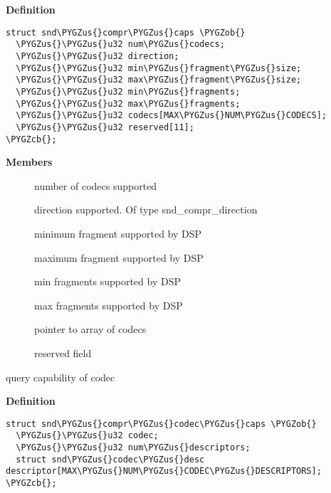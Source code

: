 \documentclass[a4paper,8pt,english]{sphinxmanual}
\def\PYGZus{\char`\_}
\def\PYGZob{\char`\{}
\def\PYGZcb{\char`\}}
\begin{document}
\textbf{Definition}

\begin{Verbatim}[commandchars=\\\{\}]
struct snd\PYGZus{}compr\PYGZus{}caps \PYGZob{}
  \PYGZus{}\PYGZus{}u32 num\PYGZus{}codecs;
  \PYGZus{}\PYGZus{}u32 direction;
  \PYGZus{}\PYGZus{}u32 min\PYGZus{}fragment\PYGZus{}size;
  \PYGZus{}\PYGZus{}u32 max\PYGZus{}fragment\PYGZus{}size;
  \PYGZus{}\PYGZus{}u32 min\PYGZus{}fragments;
  \PYGZus{}\PYGZus{}u32 max\PYGZus{}fragments;
  \PYGZus{}\PYGZus{}u32 codecs[MAX\PYGZus{}NUM\PYGZus{}CODECS];
  \PYGZus{}\PYGZus{}u32 reserved[11];
\PYGZcb{};
\end{Verbatim}

\textbf{Members}
\begin{description}
\item[{}] \leavevmode
number of codecs supported

\item[{}] \leavevmode
direction supported. Of type snd\_compr\_direction

\item[{}] \leavevmode
minimum fragment supported by DSP

\item[{}] \leavevmode
maximum fragment supported by DSP

\item[{}] \leavevmode
min fragments supported by DSP

\item[{}] \leavevmode
max fragments supported by DSP

\item[{}] \leavevmode
pointer to array of codecs

\item[{}] \leavevmode
reserved field

\end{description}

\begin{fulllineitems}
\label{sound/kernel-api/alsa-driver-api:c.snd_compr_codec_caps}
query capability of codec

\end{fulllineitems}


\textbf{Definition}

\begin{Verbatim}[commandchars=\\\{\}]
struct snd\PYGZus{}compr\PYGZus{}codec\PYGZus{}caps \PYGZob{}
  \PYGZus{}\PYGZus{}u32 codec;
  \PYGZus{}\PYGZus{}u32 num\PYGZus{}descriptors;
  struct snd\PYGZus{}codec\PYGZus{}desc descriptor[MAX\PYGZus{}NUM\PYGZus{}CODEC\PYGZus{}DESCRIPTORS];
\PYGZcb{};
\end{Verbatim}
\end{document}
